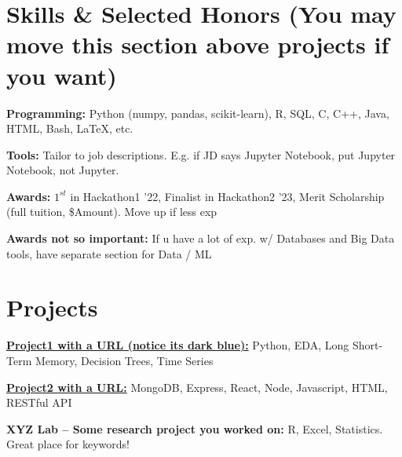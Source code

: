 \documentclass[letterpaper,10pt]{article}
\begin{document}
    \vspace{-5pt}

\section{Skills \& Selected Honors (You may move this section above projects if you want)}
     \textbf{Programming:} {Python (numpy, pandas, scikit-learn), R, SQL, C, C++, Java, HTML, Bash, \LaTeX, etc.}

    \textbf{Tools:} {Tailor to job descriptions. E.g. if JD says Jupyter Notebook, put Jupyter Notebook, not Jupyter.}
          
     \textbf{Awards:} {\textbf{$1^{st}$} in Hackathon1 '22, Finalist in Hackathon2 '23, Merit Scholarship (full tuition, \$Amount). Move up if less exp}

    \textbf{Awards not so important:} {If u have a lot of exp. w/ Databases and Big Data tools, have separate section for Data / ML}
    
    \vspace{-5pt}
    
\section{Projects}


          
     \href{https://calendly.com/nie-ryanz}{\textbf{Project1 with a URL (notice its dark blue):}} {Python, EDA, Long Short-Term Memory, Decision Trees, Time Series}
     
     \href{https://calendly.com/nie-ryanz}{\textbf{Project2 with a URL:}} {MongoDB, Express, React, Node, Javascript, HTML, RESTful API}

     \textbf{XYZ Lab -- Some research project you worked on:} {R, Excel, Statistics. Great place for keywords!}

\end{document}
